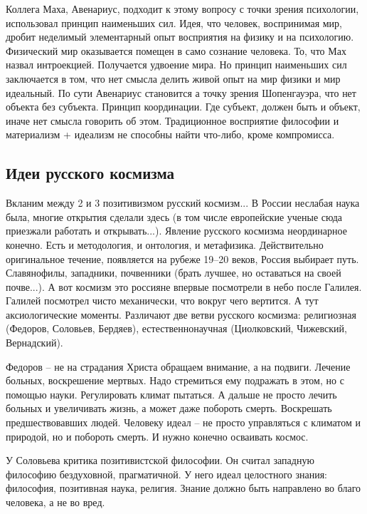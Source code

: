 \documentclass[a4paper, 12pt]{article}
\begin{document}
Коллега Маха, Авенариус, подходит к этому вопросу с точки зрения 
психологии, использовал принцип наименьших сил. Идея, что человек, 
воспринимая мир, дробит неделимый элементарный опыт восприятия на физику 
и на психологию. Физический мир оказывается помещен в само сознание 
человека. То, что Мах назвал интроекцией. Получается удвоение мира. Но 
принцип наименьших сил заключается в том, что нет смысла делить живой 
опыт на мир физики и мир идеальный. По сути Авенариус становится а точку 
зрения Шопенгауэра, что нет объекта без субъекта. Принцип координации. 
Где субъект, должен быть и объект, иначе нет смысла говорить об этом. 
Традиционное восприятие философии и материализм + идеализм не способны 
найти что-либо, кроме компромисса.


\subsection{Идеи русского космизма}

Вкланим между 2 и 3 позитивизмом русский космизм... В России неслабая 
наука была, многие открытия сделали здесь (в том числе европейские 
ученые сюда приезжали работать и открывать...). Явление русского 
космизма неординарное конечно. Есть и методология, и онтология, 
и метафизика. Действительно оригинальное течение, появляется на рубеже 
19--20 веков, Россия выбирает путь. Славянофилы, западники, почвенники 
(брать лучшее, но оставаться на своей почве...). А вот космизм это 
россияне впервые посмотрели в небо после Галилея. Галилей посмотрел 
чисто механически, что вокруг чего вертится. А тут аксиологические 
моменты. Различают две ветви русского космизма: религиозная (Федоров, 
Соловьев, Бердяев), естественнонаучная (Циолковский, Чижевский, 
Вернадский).

Федоров -- не на страдания Христа обращаем внимание, а на подвиги. 
Лечение больных, воскрешение мертвых. Надо стремиться ему подражать 
в этом, но с помощью науки. Регулировать климат пытаться. А дальше не 
просто лечить больных и увеличивать жизнь, а может даже побороть смерть. 
Воскрешать предшествовавших людей. Человеку идеал -- не просто 
управляться с климатом и природой, но и побороть смерть. И нужно конечно 
осваивать космос.

У Соловьева критика позитивистской философии. Он считал западную 
философию бездуховной, прагматичной. У него идеал целостного знания: 
философия, позитивная наука, религия. Знание должно быть направлено во 
благо человека, а не во вред.
\end{document}
